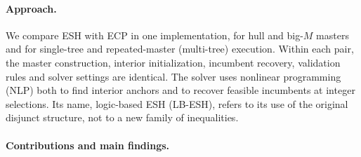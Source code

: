 \paragraph{Approach.}
We compare ESH with ECP in one implementation, for hull and big-$M$ masters and for single-tree and repeated-master (multi-tree) execution. Within each pair, the master construction, interior initialization, incumbent recovery, validation rules and solver settings are identical. The solver uses nonlinear programming (NLP) both to find interior anchors and to recover feasible incumbents at integer selections. Its name, logic-based ESH (LB-ESH), refers to its use of the original disjunct structure, not to a new family of inequalities.

\paragraph{Contributions and main findings.}
